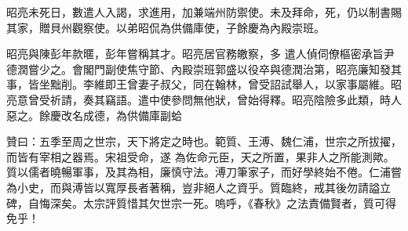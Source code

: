 \begin{pinyinscope}
 昭亮未死日，數遣人入謁，求進用，加兼端州防禦使。未及拜命，死，仍以制書賜其家，贈貝州觀察使。以弟昭侃為供備庫使，子餘慶為內殿崇班。



 昭亮與陳彭年款暱，彭年嘗稱其才。昭亮居官務皦察，多
 遣人偵伺僚樞密承旨尹德潤嘗少之。會閣門副使焦守節、內殿崇班郭盛以役卒與德潤治第，昭亮廉知發其事，皆坐黜削。李維即王曾妻子叔父，同在翰林，曾受詔試舉人，以家事屬維。昭亮意曾受祈請，奏其竊語。遣中使參問無他狀，曾始得釋。昭亮陰險多此類，時人惡之。餘慶改名成德，為供備庫副蛤



 贊曰：五季至周之世宗，天下將定之時也。範質、王溥、魏仁浦，世宗之所拔擢，而皆有宰相之器焉。宋祖受命，遂
 為佐命元臣，天之所置，果非人之所能測歟。質以儒者曉暢軍事，及其為相，廉慎守法。溥刀筆家子，而好學終始不倦。仁浦嘗為小史，而與溥皆以寬厚長者著稱，豈非絕人之資乎。質臨終，戒其後勿請謚立碑，自悔深矣。太宗評質惜其欠世宗一死。嗚呼，《春秋》之法責備賢者，質可得免乎！



\end{pinyinscope}